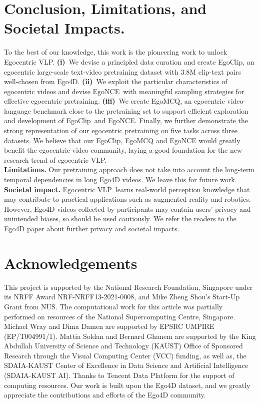 \documentclass{article}
\newcommand{\vlp}{Egocentric VLP}
\newcommand{\dataset}{EgoClip}
\newcommand{\model}{EgoNCE\xspace}
\begin{document}
\section{Conclusion, Limitations, and Societal Impacts.}
To the best of our knowledge, this work is the pioneering work to unlock \vlp.
\textbf{(i)}~We devise a principled data curation and create EgoClip, an egocentric large-scale text-video pretraining dataset with $3.8$M clip-text pairs well-chosen from Ego4D.
\textbf{(ii)}~We exploit the particular characteristics of egocentric videos and devise \model~with meaningful sampling strategies for effective egocentric pretraining.
\textbf{(iii)}~We create EgoMCQ, an egocentric video-language benchmark close to the pretraining set to support efficient exploration and development of \dataset~and \model.
Finally, we further demonstrate the strong representation of our egocentric pretraining on five tasks across three datasets. 
We believe that our EgoClip, EgoMCQ and EgoNCE would greatly benefit the egocentric video community, laying a good foundation for the new research trend of egocentric VLP. \\
\textbf{Limitations.} 
Our pretraining approach does not take into account the long-term temporal dependencies in long Ego4D videos. We leave this for future work. \\
\textbf{Societal impact.} 
\vlp~learns real-world perception knowledge that may contribute to practical applications such as augmented reality and robotics.
However, Ego4D videos collected by participants may contain users' privacy and unintended biases, so should be used cautiously. We refer the readers to the Ego4D paper about further privacy and societal impacts. \section{Acknowledgements}
This project is supported by the National Research Foundation, Singapore under its NRFF Award NRF-NRFF13-2021-0008, and Mike Zheng Shou's Start-Up Grant from NUS. The computational work for this article was partially performed on resources of the National Supercomputing Centre, Singapore. Michael Wray and Dima Damen are supported by EPSRC UMPIRE (EP/T004991/1). Mattia Soldan and Bernard Ghanem 
are supported by the King Abdullah University of Science and Technology (KAUST) Office of Sponsored Research through the Visual Computing Center (VCC) funding, as well as, the SDAIA-KAUST Center of Excellence in Data Science and Artificial Intelligence (SDAIA-KAUST AI).
Thanks to Tencent Data Platform for the support of computing resources.
Our work is built upon the Ego4D dataset, and we greatly appreciate the contributions and efforts of the Ego4D community.
 
\end{document}
